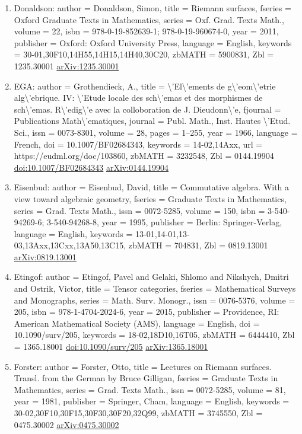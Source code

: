 \documentclass[11pt]{article}
\begin{document}
\begin{enumerate}[leftmargin=*]
  \item Donaldson: author = Donaldson, Simon, title = Riemann surfaces, fseries = Oxford Graduate Texts in Mathematics, series = Oxf. Grad. Texts Math., volume = 22, isbn = 978-0-19-852639-1; 978-0-19-960674-0, year = 2011, publisher = Oxford: Oxford University Press, language = English, keywords = 30-01,30F10,14H55,14H15,14H40,30C20, zbMATH = 5900831, Zbl = 1235.30001 \href{https://arxiv.org/abs/1235.30001}{arXiv:1235.30001}
  \item EGA: author = Grothendieck, A., title = \textbackslash{}'El\textbackslash{}'ements de g\textbackslash{}'eom\textbackslash{}'etrie alg\textbackslash{}'ebrique. IV: \textbackslash{}'Etude locale des sch\textbackslash{}'emas et des morphismes de sch\textbackslash{}'emas. R\textbackslash{}'edig\textbackslash{}'e avec la colloboration de J. Dieudonn\textbackslash{}'e, fjournal = Publications Math\textbackslash{}'ematiques, journal = Publ. Math., Inst. Hautes \textbackslash{}'Etud. Sci., issn = 0073-8301, volume = 28, pages = 1--255, year = 1966, language = French, doi = 10.1007/BF02684343, keywords = 14-02,14Axx, url = https://eudml.org/doc/103860, zbMATH = 3232548, Zbl = 0144.19904 \href{https://doi.org/10.1007/BF02684343}{doi:10.1007/BF02684343} \href{https://arxiv.org/abs/0144.19904}{arXiv:0144.19904}
  \item Eisenbud: author = Eisenbud, David, title = Commutative algebra. With a view toward algebraic geometry, fseries = Graduate Texts in Mathematics, series = Grad. Texts Math., issn = 0072-5285, volume = 150, isbn = 3-540-94269-6; 3-540-94268-8, year = 1995, publisher = Berlin: Springer-Verlag, language = English, keywords = 13-01,14-01,13-03,13Axx,13Cxx,13A50,13C15, zbMATH = 704831, Zbl = 0819.13001 \href{https://arxiv.org/abs/0819.13001}{arXiv:0819.13001}
  \item Etingof: author = Etingof, Pavel and Gelaki, Shlomo and Nikshych, Dmitri and Ostrik, Victor, title = Tensor categories, fseries = Mathematical Surveys and Monographs, series = Math. Surv. Monogr., issn = 0076-5376, volume = 205, isbn = 978-1-4704-2024-6, year = 2015, publisher = Providence, RI: American Mathematical Society (AMS), language = English, doi = 10.1090/surv/205, keywords = 18-02,18D10,16T05, zbMATH = 6444410, Zbl = 1365.18001 \href{https://doi.org/10.1090/surv/205}{doi:10.1090/surv/205} \href{https://arxiv.org/abs/1365.18001}{arXiv:1365.18001}
  \item Forster: author = Forster, Otto, title = Lectures on Riemann surfaces. Transl. from the German by Bruce Gilligan, fseries = Graduate Texts in Mathematics, series = Grad. Texts Math., issn = 0072-5285, volume = 81, year = 1981, publisher = Springer, Cham, language = English, keywords = 30-02,30F10,30F15,30F30,30F20,32Q99, zbMATH = 3745550, Zbl = 0475.30002 \href{https://arxiv.org/abs/0475.30002}{arXiv:0475.30002}

\end{enumerate}
\end{document}
